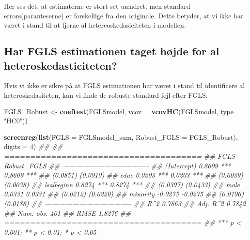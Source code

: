 \documentclass[
  10pt,
]{article}
\newenvironment{Shaded}{\begin{snugshade}}{\end{snugshade}}
\newcommand{\CommentTok}[1]{\textcolor[rgb]{0.56,0.35,0.01}{\textit{#1}}}
\newcommand{\DataTypeTok}[1]{\textcolor[rgb]{0.13,0.29,0.53}{#1}}
\newcommand{\DecValTok}[1]{\textcolor[rgb]{0.00,0.00,0.81}{#1}}
\newcommand{\KeywordTok}[1]{\textcolor[rgb]{0.13,0.29,0.53}{\textbf{#1}}}
\newcommand{\NormalTok}[1]{#1}
\newcommand{\StringTok}[1]{\textcolor[rgb]{0.31,0.60,0.02}{#1}}
\begin{document}
Her ses det, at estimaterne er stort set uændret, men standard
errors(paranteserne) er forskellige fra den originale. Dette betyder, at
vi ikke har været i stand til at fjerne al hetereoskedasiciteten i
modellen.\\
\newpage

\hypertarget{har-fgls-estimationen-taget-huxf8jde-for-al-heteroskedasticiteten}{%
\subsection{Har FGLS estimationen taget højde for al
heteroskedasticiteten?}\label{har-fgls-estimationen-taget-huxf8jde-for-al-heteroskedasticiteten}}

\leavevmode

Hvis vi ikke er sikre på at FGLS estimationen har været i stand til
identificere al heteroskedasiteten, kan vi finde de robuste standard
fejl efter FGLS.

\begin{Shaded}
\begin{Highlighting}[]
\NormalTok{FGLS_Robust <-}\StringTok{ }\KeywordTok{coeftest}\NormalTok{(FGLSmodel, }\DataTypeTok{vcov =} \KeywordTok{vcovHC}\NormalTok{(FGLSmodel, }\DataTypeTok{type =} \StringTok{"HC0"}\NormalTok{))}

\KeywordTok{screenreg}\NormalTok{(}\KeywordTok{list}\NormalTok{(}\DataTypeTok{FGLS =}\NormalTok{ FGLSmodel_sum, }\DataTypeTok{Robust_FGLS =}\NormalTok{ FGLS_Robust), }\DataTypeTok{digits =} \DecValTok{4}\NormalTok{)}
\CommentTok{## }
\CommentTok{## ======================================}
\CommentTok{##              FGLS          Robust_FGLS}
\CommentTok{## --------------------------------------}
\CommentTok{## (Intercept)    0.8609 ***   0.8609 ***}
\CommentTok{##               (0.0851)     (0.0910)   }
\CommentTok{## educ           0.0203 ***   0.0203 ***}
\CommentTok{##               (0.0039)     (0.0038)   }
\CommentTok{## lsalbeginn     0.8274 ***   0.8274 ***}
\CommentTok{##               (0.0397)     (0.0433)   }
\CommentTok{## male           0.0331       0.0331    }
\CommentTok{##               (0.0212)     (0.0220)   }
\CommentTok{## minority      -0.0275      -0.0275    }
\CommentTok{##               (0.0196)     (0.0188)   }
\CommentTok{## --------------------------------------}
\CommentTok{## R^2            0.7863                 }
\CommentTok{## Adj. R^2       0.7842                 }
\CommentTok{## Num. obs.    401                      }
\CommentTok{## RMSE           1.8276                 }
\CommentTok{## ======================================}
\CommentTok{## *** p < 0.001; ** p < 0.01; * p < 0.05}
\end{Highlighting}
\end{Shaded}
\end{document}
